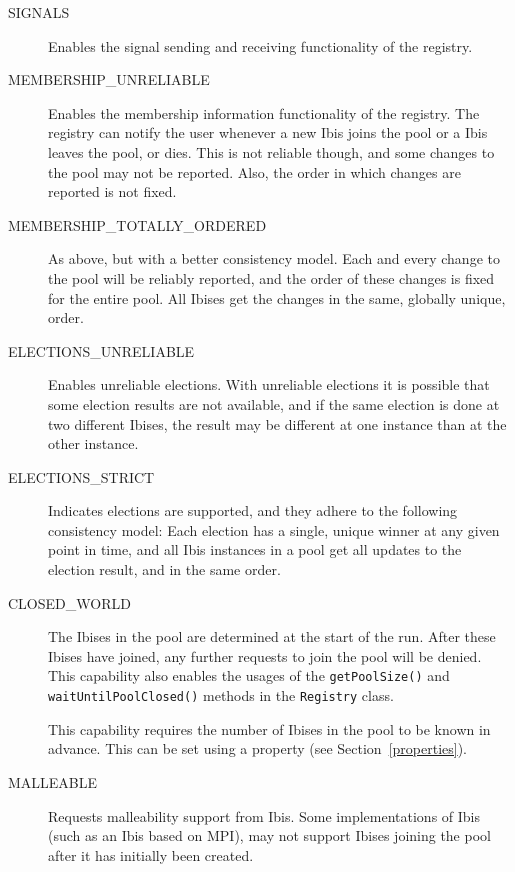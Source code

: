 \documentclass[10pt]{article}
\begin{document}
\begin{description}

\item[SIGNALS]
Enables the signal sending and receiving functionality of the registry.

\item[MEMBERSHIP\_UNRELIABLE] 
Enables the membership information functionality of the registry. The
registry can notify the user whenever a new Ibis joins the pool or a
Ibis leaves the pool, or dies. This is not reliable though, and some
changes to the pool may not be reported. Also, the order in which
changes are reported is not fixed.

\item[MEMBERSHIP\_TOTALLY\_ORDERED]
As above, but with a better consistency model. Each and every change to
the pool will be reliably reported, and the order of these changes is
fixed for the entire pool. All Ibises get the changes in the same,
globally unique, order.

\item[ELECTIONS\_UNRELIABLE] Enables unreliable elections. With
unreliable elections it is possible that some election results are not
available, and if the same election is done at two different Ibises, the
result may be different at one instance than at the other instance.

\item[ELECTIONS\_STRICT]
Indicates elections are supported, and they adhere to the following 
consistency model: Each election has a single, unique winner at any
given point in time, and all Ibis instances in a pool get all updates
to the election result, and in the same order.

\item[CLOSED\_WORLD] The Ibises in the pool are determined at the start
of the run. After these Ibises have joined, any further requests to join
the pool will be denied. This capability also enables the usages of the
\texttt{getPoolSize()} and \texttt{waitUntilPoolClosed()} methods in the
\texttt{Registry} class. 

This capability requires the number of Ibises
in the pool to be known in advance. This can be set using a property
(see Section~\ref{properties}).

\item[MALLEABLE]
Requests malleability support from Ibis. Some implementations of Ibis
(such as an Ibis based on MPI), may not support Ibises joining the pool
after it has initially been created.

\end{description}
\end{document}

